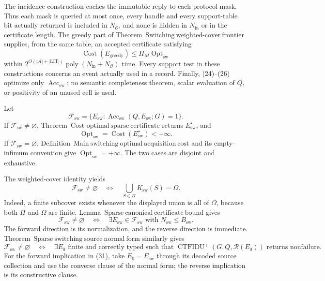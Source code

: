The incidence construction caches the immutable reply to each protocol mask.  Thus each mask is queried at most once, every handle and every support-table bit actually returned is included in \(N_{\mathcal O}\), and none is hidden in \(N_{\mathrm{in}}\) or in the certificate length.  The greedy part of Theorem~\(\mathrm{Switching\ weighted\mbox{-}cover\ frontier}\) supplies, from the same table, an accepted certificate satisfying
\[
 \operatorname{Cost}(E_{\mathrm{greedy}})
 \leq H_M\operatorname{Opt}_{\mathrm{sw}}
 \tag{26}
\]
within \(2^{O(|\mathcal A|+|\mathrm{LIT}|)}\operatorname{poly}(N_{\mathrm{in}}+N_{\mathcal O})\) time.  Every support test in these constructions concerns an event actually used in a record.  Finally, (24)--(26) optimize only \(\operatorname{Acc}_{\mathrm{sw}}\); no semantic completeness theorem, scalar evaluation of \(Q\), or positivity of an unused cell is used.

Let
\[
 \mathcal F_{\mathrm{sw}}
 =\{E_{\mathrm{sw}}:\operatorname{Acc}_{\mathrm{sw}}(Q,E_{\mathrm{sw}};G)=1\}.
 \tag{27}
\]
If \(\mathcal F_{\mathrm{sw}}\ne\varnothing\), Theorem~\(\mathrm{Cost\mbox{-}optimal\ sparse\ certificate}\) returns \(E_{\mathrm{sw}}^{\star}\), and
\[
 \operatorname{Opt}_{\mathrm{sw}}
 =\operatorname{Cost}(E_{\mathrm{sw}}^{\star})<+\infty.
 \tag{28}
\]
If \(\mathcal F_{\mathrm{sw}}=\varnothing\), Definition~\(\mathrm{Main\ switching\ optimal\ acquisition\ cost}\) and its empty-infimum convention give \(\operatorname{Opt}_{\mathrm{sw}}=+\infty\).  The two cases are disjoint and exhaustive.

The weighted-cover identity yields
\[
 \mathcal F_{\mathrm{sw}}\ne\varnothing
 \quad\Longleftrightarrow\quad
 \bigcup_{S\in\Pi}K_{\mathrm{sw}}(S)=\Omega.
 \tag{29}
\]
Indeed, a finite subcover exists whenever the displayed union is all of \(\Omega\), because both \(\Pi\) and \(\Omega\) are finite.  Lemma~\(\mathrm{Sparse\ canonical\ certificate\ bound}\) gives
\[
 \mathcal F_{\mathrm{sw}}\ne\varnothing
 \quad\Longleftrightarrow\quad
 \exists E_{\mathrm{sw}}\in\mathcal F_{\mathrm{sw}}
 \text{ with }N_{\mathrm{sw}}\leq B_{\mathrm{sw}}.
 \tag{30}
\]
The forward direction is its normalization, and the reverse direction is immediate.  Theorem~\(\mathrm{Sparse\ switching\ source\ normal\ form}\) similarly gives
\[
 \mathcal F_{\mathrm{sw}}\ne\varnothing
 \quad\Longleftrightarrow\quad
 \exists E_0\text{ finite and correctly typed such that }
 \operatorname{CTFIDU}^{+}(G,Q,\mathcal R(E_0))
 \text{ returns nonfailure}.
 \tag{31}
\]
For the forward implication in (31), take \(E_0=E_{\mathrm{sw}}\) through its decoded source collection and use the converse clause of the normal form; the reverse implication is its constructive clause.

